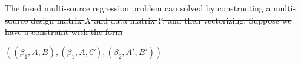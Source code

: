 \documentclass[11pt]{article}
\providecommand{\DIFdel}[1]{{\protect\color{red}\sout{#1}}}                      %
\begin{document}


\DIFdel{The fused multi-source regression problem can solved by constructing a multi-source design matrix $X$ and data matrix $Y$, and then vectorizing.
Suppose we have a constraint with the form
}%


\DIFdel{$((\beta_1, A, B), (\beta_1, A, C), (\beta_2, A', B'))$
}%
\end{document}
